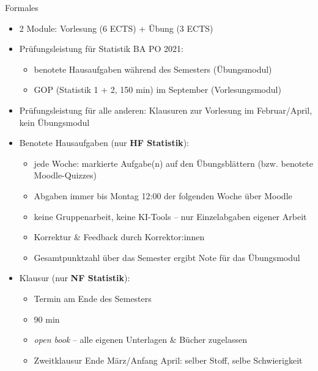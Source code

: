\documentclass[
  10pt,
  ignorenonframetext,
]{beamer}
\providecommand{\tightlist}{%
  \setlength{\itemsep}{0pt}\setlength{\parskip}{0pt}}
\begin{document}
\begin{frame}{Formales}
\protect\hypertarget{formales}{}
\begin{itemize}
\item
  2 Module: Vorlesung (6 ECTS) + Übung (3 ECTS)
\item
  Prüfungsleistung für Statistik BA PO 2021:

  \begin{itemize}
  \tightlist
  \item
    benotete Hausaufgaben während des Semesters (Übungsmodul)
  \item
    GOP (Statistik 1 + 2, 150 min) im September (Vorlesungsmodul)
  \end{itemize}
\item
  Prüfungsleistung für alle anderen: Klausuren zur Vorlesung im
  Februar/April, kein Übungsmodul
\item
  Benotete Hausaufgaben (nur \textbf{HF Statistik}):

  \begin{itemize}
  \tightlist
  \item
    jede Woche: markierte Aufgabe(n) auf den Übungsblättern (bzw.
    benotete Moodle-Quizzes)
  \item
    Abgaben immer bis Montag 12:00 der folgenden Woche über Moodle
  \item
    keine Gruppenarbeit, keine KI-Tools -- nur Einzelabgaben eigener
    Arbeit
  \item
    Korrektur \& Feedback durch Korrektor:innen
  \item
    Gesamtpunktzahl über das Semester ergibt Note für das Übungsmodul
  \end{itemize}
\item
  Klausur (nur \textbf{NF Statistik}):

  \begin{itemize}
  \tightlist
  \item
    Termin am Ende des Semesters
  \item
    90 min
  \item
    \emph{open book} -- alle eigenen Unterlagen \& Bücher zugelassen
  \item
    Zweitklausur Ende März/Anfang April: selber Stoff, selbe
    Schwierigkeit
  \end{itemize}
\end{itemize}
\end{frame}
\end{document}
